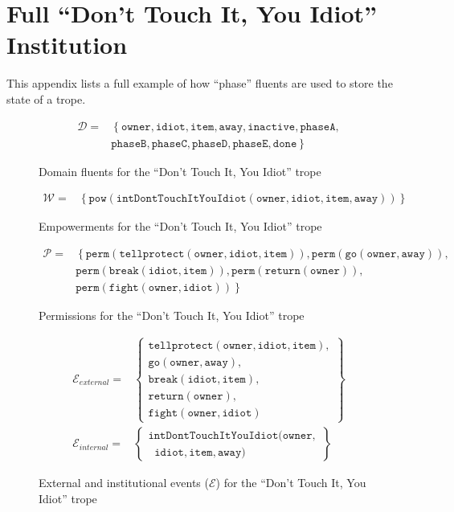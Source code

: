 \documentclass[11pt]{report}
\begin{document}
\chapter{Full ``Don't Touch It, You Idiot'' Institution}
\label{appendix:sausages-full}
This appendix lists a full example of how ``phase'' fluents are used to store
the state of a trope.

\begin{figure}[!th]
\begin{align*}
  \mathcal{D} =&\left\{\mathtt{owner, idiot, item, away, inactive, phaseA,}\right.\\\nonumber
  &\left. {} \mathtt{phaseB, phaseC, phaseD, phaseE, done}\right\} %
\end{align*}
\caption{Domain fluents for the ``Don't Touch It, You Idiot'' trope}\label{eq:sausages-domain}
\end{figure}

\begin{figure}[!th]
\begin{align*}
  \mathcal{W} =&\left\{\mathtt{pow(intDontTouchItYouIdiot(owner, idiot, item, away))}\right\}
\end{align*}
\caption{Empowerments for the ``Don't Touch It, You Idiot'' trope}\label{eq:sausages-power}
\end{figure}

\begin{figure}[!th]
\begin{align*}
  \mathcal{P} =& \left\{\mathtt{perm(tellprotect(owner, idiot, item)), perm(go(owner, away)),}\right.\nonumber\\
  &\left. {} \mathtt{perm(break(idiot, item)), perm(return(owner)),}\right.\nonumber\\
             &\left. {} \mathtt{perm(fight(owner, idiot))}\right\} %
\end{align*}
\caption{Permissions for the ``Don't Touch It, You Idiot'' trope}\label{eq:sausages-perms}
\end{figure}

\begin{figure}[!th]\small
\begin{align}
  \mathcal{E}_{external} = &\left\{\begin{array}{c}
\mathtt{tellprotect(owner, idiot, item)},\\
\mathtt{go(owner, away)},\\
\mathtt{break(idiot, item)},\\
\mathtt{return(owner)},\\
\mathtt{fight(owner, idiot)}
\end{array}
\right\}\label{eq:eobs-hero-full}\\
  \mathcal{E}_{internal} = &\left\{\begin{array}{l}
\mathtt{intDontTouchItYouIdiot(owner,}\\
\;\;\mathtt{idiot, item, away)}
\end{array}\right\}
\label{eq:einst-hero-full}
\end{align}
\caption{External and institutional events ($\mathcal{E}$) for the ``Don't Touch
  It, You Idiot'' trope}\label{fig:sausage-events}
\end{figure}
\end{document}
